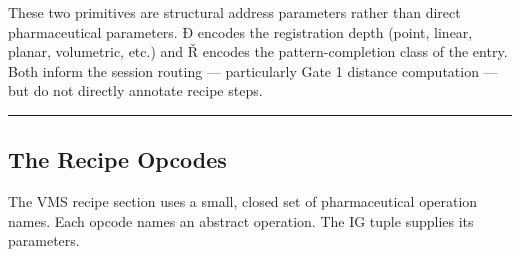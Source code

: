\documentclass[12pt,a4paper]{article}
\begin{document}
These two primitives are structural address parameters rather than
direct pharmaceutical parameters. Ð encodes the registration depth
(point, linear, planar, volumetric, etc.) and Ř encodes the
pattern-completion class of the entry. Both inform the session routing
--- particularly Gate 1 distance computation --- but do not directly
annotate recipe steps.

\begin{center}\rule{0.5\linewidth}{0.5pt}\end{center}

\hypertarget{the-recipe-opcodes}{%
\subsection{The Recipe Opcodes}\label{the-recipe-opcodes}}

The VMS recipe section uses a small, closed set of pharmaceutical
operation names. Each opcode names an abstract operation. The IG tuple
supplies its parameters.
\end{document}
